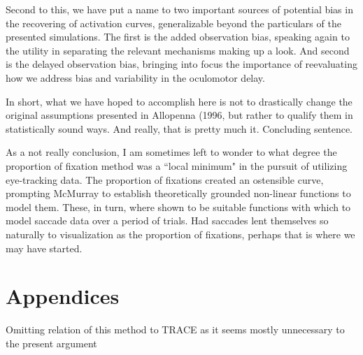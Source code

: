 Second to this, we have put a name to two important sources of potential bias in the recovering of activation curves, generalizable beyond the particulars of the presented simulations. The first is the added observation bias, speaking again to the utility in separating the relevant mechanisms making up a look. And second is the delayed observation bias, bringing into focus the importance of reevaluating how we address bias and variability in the oculomotor delay.


In short, what we have hoped to accomplish here is not to drastically change the original assumptions presented in Allopenna (1996, but rather to qualify them in statistically sound ways. And really, that is pretty much it. Concluding sentence.


As a not really conclusion, I am sometimes left to wonder to what degree the proportion of fixation method was a  ``local minimum" in the pursuit of utilizing eye-tracking data. The proportion of fixations created an ostensible curve, prompting McMurray to establish theoretically grounded non-linear functions to model them. These, in turn, where shown to be suitable functions with which to model saccade data over a period of trials. Had saccades lent themselves so naturally to visualization as the proportion of fixations, perhaps that is where we may have started.


\section{Appendices}

Omitting relation of this method to TRACE as it seems mostly unnecessary to the present argument 


%



%

